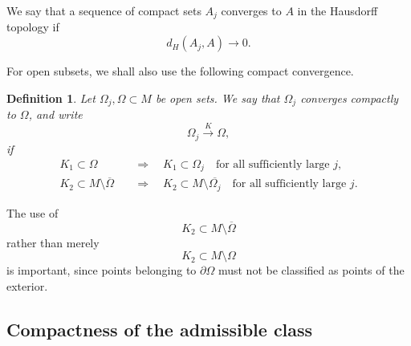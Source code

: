 \documentclass{article}
\newtheorem{definition}[theorem]{Definition}
\begin{document}
We say that a sequence of compact sets $A_j$ converges to $A$ in the
Hausdorff topology if
\[
d_H(A_j,A)\longrightarrow0.
\]

For open subsets, we shall also use the following compact convergence.

\begin{definition}
\label{def:compact-convergence}
Let $\Omega_j,\Omega\subset M$ be open sets. We say that
$\Omega_j$ converges compactly to $\Omega$, and write
\[
\Omega_j\xrightarrow{K}\Omega,
\]
if
\begin{align}
K_1\subset\Omega
&\quad\Longrightarrow\quad
K_1\subset\Omega_j
\quad\text{for all sufficiently large }j,
\label{eq:compact-conv-inside}
\\
K_2\subset M\setminus\overline{\Omega}
&\quad\Longrightarrow\quad
K_2\subset M\setminus\overline{\Omega_j}
\quad\text{for all sufficiently large }j.
\label{eq:compact-conv-outside}
\end{align}
\end{definition}

The use of
\[
K_2\subset M\setminus\overline{\Omega}
\]
rather than merely
\[
K_2\subset M\setminus\Omega
\]
is important, since points belonging to $\partial\Omega$ must not be
classified as points of the exterior.

\subsection{Compactness of the admissible class}
\label{subsec:compactness-admissible}
\end{document}
